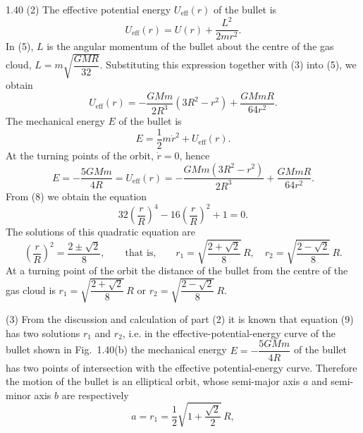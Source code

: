 \begin{solution}{1.40}
(2) The effective potential energy $U_{\mathrm{eff}}(r)$ of the bullet is
\begin{equation}
U_{\mathrm{eff}}(r)=U(r)+\frac{L^2}{2mr^2}. \tag{5}
\end{equation}
In (5), $L$ is the angular momentum of the bullet about the centre of the gas cloud, $L=m\sqrt{\dfrac{GMR}{32}}$. Substituting this expression together with (3) into (5), we obtain
\begin{equation}
U_{\mathrm{eff}}(r)=-\frac{GMm}{2R^3}\left(3R^2-r^2\right)+\frac{GMmR}{64r^2}. \tag{6}
\end{equation}
The mechanical energy $E$ of the bullet is
\begin{equation}
E=\frac{1}{2}m\dot{r}^2+U_{\mathrm{eff}}(r). \tag{7}
\end{equation}
At the turning points of the orbit, $\dot{r}=0$, hence
\begin{equation}
E=-\frac{5GMm}{4R}=U_{\mathrm{eff}}(r)
=-\frac{GMm\left(3R^2-r^2\right)}{2R^3}+\frac{GMmR}{64r^2}. \tag{8}
\end{equation}
From (8) we obtain the equation
\begin{equation}
32\left(\frac{r}{R}\right)^4-16\left(\frac{r}{R}\right)^2+1=0. \tag{9}
\end{equation}
The solutions of this quadratic equation are
\[
\left(\frac{r}{R}\right)^2=\frac{2\pm\sqrt{2}}{8},
\qquad\text{that is,}\qquad
r_1=\sqrt{\frac{2+\sqrt{2}}{8}}\,R,\quad
r_2=\sqrt{\frac{2-\sqrt{2}}{8}}\,R.
\]
At a turning point of the orbit the distance of the bullet from the centre of the gas cloud is $r_1=\sqrt{\dfrac{2+\sqrt{2}}{8}}\,R$ or $r_2=\sqrt{\dfrac{2-\sqrt{2}}{8}}\,R$.

(3) From the discussion and calculation of part (2) it is known that equation (9) has two solutions $r_1$ and $r_2$, i.e. in the effective-potential-energy curve of the bullet shown in Fig.~1.40(b) the mechanical energy $E=-\dfrac{5GMm}{4R}$ of the bullet has two points of intersection with the effective potential-energy curve. Therefore the motion of the bullet is an elliptical orbit, whose semi-major axis $a$ and semi-minor axis $b$ are respectively
\[
a=r_1=\frac{1}{2}\sqrt{1+\frac{\sqrt{2}}{2}}\,R,
\]


\end{solution}
